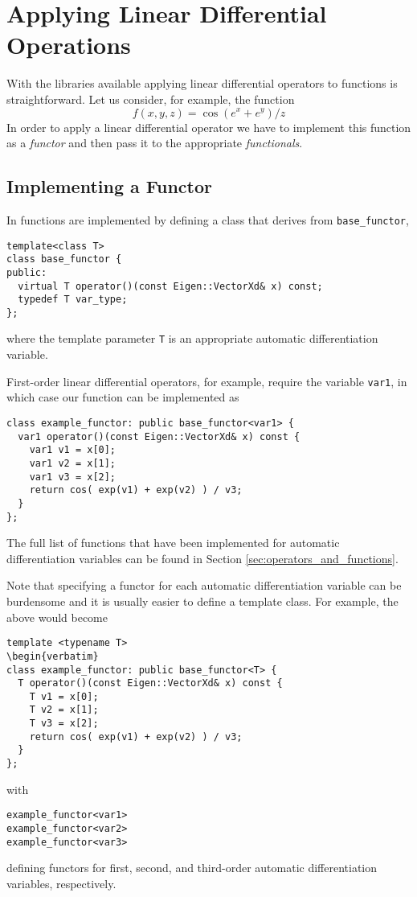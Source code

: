 \section{Applying Linear Differential Operations}

With the \nomad libraries available applying linear differential operators
to functions is straightforward.  Let us consider, for example, the
function
%
\begin{equation*}
f \! \left( x, y, z \right) = \cos \! \left( e^{x} + e^{y} \right) / z
\end{equation*}
%
In order to apply a linear differential operator we have to implement
this function as a \textit{functor} and then pass it to the appropriate
\textit{functionals}.

\subsection{Implementing a Functor}

In \nomad functions are implemented by defining a class
that derives from \verb|base_functor|,
%
\begin{verbatim}
template<class T>
class base_functor {
public:
  virtual T operator()(const Eigen::VectorXd& x) const;
  typedef T var_type;
};
\end{verbatim}
%
where the template parameter \verb|T| is an appropriate automatic 
differentiation variable.  

First-order linear differential operators, for example, require the 
variable \verb|var1|, in which case our function can be implemented as
%
\begin{verbatim}
class example_functor: public base_functor<var1> {
  var1 operator()(const Eigen::VectorXd& x) const {
    var1 v1 = x[0];
    var1 v2 = x[1];
    var1 v3 = x[2];
    return cos( exp(v1) + exp(v2) ) / v3;  
  }
};
\end{verbatim}
%
The full list of functions that have been implemented for automatic
differentiation variables can be found in Section \ref{sec:operators_and_functions}.

Note that specifying a functor for each automatic differentiation variable 
can be burdensome and it is usually easier to define a template class.  
For example, the above would become
%
\begin{verbatim}
template <typename T>
\begin{verbatim}
class example_functor: public base_functor<T> {
  T operator()(const Eigen::VectorXd& x) const {
    T v1 = x[0];
    T v2 = x[1];
    T v3 = x[2];
    return cos( exp(v1) + exp(v2) ) / v3;  
  }
};
\end{verbatim}
%
with
%
\begin{verbatim}
example_functor<var1>
example_functor<var2>
example_functor<var3>
\end{verbatim}
%
defining functors for first, second, and third-order automatic differentiation
variables, respectively.

